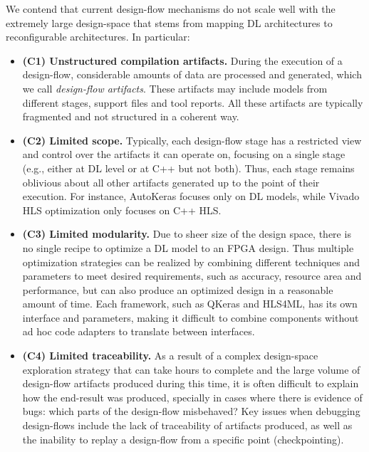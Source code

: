 We contend that current design-flow mechanisms do not scale well with the extremely large design-space that stems from mapping DL architectures to reconfigurable architectures. In particular:

\begin{itemize}
\item[] \textbf{(C1) Unstructured compilation artifacts.} During the execution of a design-flow, considerable amounts of data are processed and generated, which we call \textit{design-flow artifacts}. These artifacts may include models from different stages, support files and tool reports. All these artifacts are typically fragmented and not structured in a coherent way.

\item[] \textbf{(C2) Limited scope.} Typically, each design-flow stage has a restricted view and control over the artifacts it can operate on, focusing on a single stage (e.g., either at DL level or at C++ but not both). Thus, each stage remains oblivious about all other artifacts generated up to the point of their execution. For instance, AutoKeras focuses only on DL models, while Vivado HLS optimization only focuses on C++ HLS. 

\item[] \textbf{(C3) Limited modularity.} Due to sheer size of the design space, there is no single recipe to optimize a DL model to an FPGA design. Thus multiple optimization strategies can be realized by combining different techniques and parameters to meet desired requirements,  such as accuracy, resource area and performance, but can also produce an optimized design in a reasonable amount of time. Each framework, such as QKeras and HLS4ML, has its own interface and parameters, making it difficult to combine components without ad hoc code adapters to translate between interfaces.

\item[] \textbf{(C4) Limited traceability.} As a result of a complex design-space exploration strategy that can take hours to complete and the large volume of design-flow artifacts produced during this time, it is often difficult to explain how the end-result was produced, specially in cases where there is evidence of bugs: which parts of the design-flow misbehaved? Key issues when debugging design-flows include the lack of traceability of artifacts produced, as well as the inability to replay a design-flow from a specific point (checkpointing).
\end{itemize}


